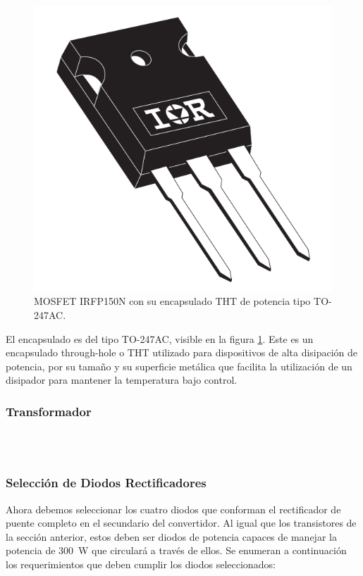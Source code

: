 \begin{figure}[h]
    \centering
    \includegraphics[scale=0.15]{Imagenes/IRFP150-TO247AC.png}
    \caption{MOSFET IRFP150N con su encapsulado THT de potencia tipo TO-247AC.}
    \label{irfp150}
\end{figure}

El encapsulado es del tipo TO-247AC, visible en la figura \ref{irfp150}. Este es un encapsulado through-hole o THT utilizado para dispositivos de alta disipación de potencia, por su tamaño y su superficie metálica que facilita la utilización de un disipador para mantener la temperatura bajo control.\\

\subsubsection{Transformador}

\lipsum[3]\\

\lipsum[4]\\

\subsubsection{Selección de Diodos Rectificadores}

Ahora debemos seleccionar los cuatro diodos que conforman el rectificador de puente completo en el secundario del convertidor. Al igual que los transistores de la sección anterior, estos deben ser diodos de potencia capaces de manejar la potencia de \SI[]{300}[]{\watt} que circulará a través de ellos. Se enumeran a continuación los requerimientos que deben cumplir los diodos seleccionados:\\

